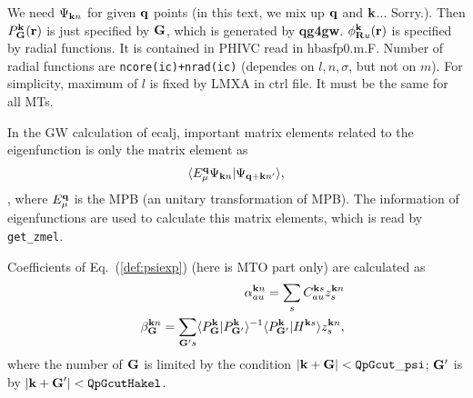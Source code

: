 \documentclass[a4paper,10pt,epsf,fleqn]{article}
\newcommand{\bfq}{{\bf q}}
\newcommand{\bfk}{{\bf k}}
\newcommand{\bfG}{{\bf G}}
\newcommand{\exe}[1]{{\bf #1}}
\newcommand{\io}[1]{{\sf  #1}}
\newcommand{\req}[1]{\mbox{Eq.~(\ref{#1})}}
\begin{document}
We need $\Psi_{{\bf k}n}$ for given $\bfq$ points 
(in this text, we mix up $\bfq$ and $\bfk$... Sorry.).
Then $P_{\bf G}^{\bf k}({\bf r})$ is just specified by 
$\bfG$, which is generated by \exe{qg4gw}.
$\phi_{{\bf R}u}^{\bf k}({\bf r})$ is specified by
radial functions. It is contained in \io{PHIVC} read in hbasfp0.m.F. Number of radial functions are
\verb#ncore(ic)+nrad(ic)# 
(dependes on $l,n,\sigma$, but not on $m$).
For simplicity, maximum of $l$ is fixed by LMXA in ctrl file.
It must be the same for all MTs.

In the GW calculation of ecalj, important matrix elements related
to the eigenfunction is only the matrix element as
\begin{eqnarray}
\langle E^{\bf q}_\mu \Psi_{{\bf k}n} |\Psi_{{\bf q+k}n'} \rangle,
\end{eqnarray}
, where $E^{\bf q}_\mu$ is the MPB (an unitary transformation of MPB).
The information of eigenfunctions are used to calculate this matrix elements, which is read by \verb#get_zmel#.


\newpage

Coefficients of \req{def:psiexp} (here is MTO part only)
are calculated as
\begin{eqnarray}
&&\alpha^{{\bf k} n}_{au} = \sum_s C^{{\bf k}s}_{a u} z^{{\bf k}n}_s \\
&&\beta^{{\bf k}n}_{\bf G} = \sum_{{\bf G}'s} 
\langle P^{\bf k}_{\bf G}|P^{\bf k}_{{\bf G}'}\rangle^{-1}
\langle P^{\bf k}_{{\bf G}'}|H^{{\bf k}s}\rangle z^{{\bf k}n}_s,
\end{eqnarray}
where the number of ${\bf G}$ is limited by the condition
$|{\bf k+G}|< {\tt QpGcut\_psi}$;
${\bf G}'$ is by $|{\bf k+G}'|< {\tt  QpGcutHakel}$.
\end{document}
